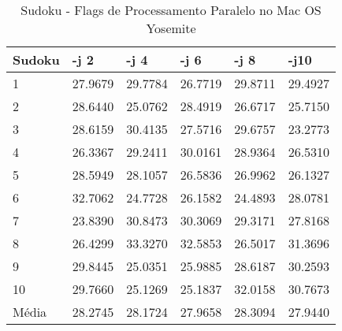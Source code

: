 \begin{table}[!ht]
\centering
\caption{Sudoku - Flags de Processamento Paralelo no Mac OS Yosemite}
\label{tab:flag_processamento_paralelo:mac:sudoku}
\begin{tabular}{llllll}
\textbf{Sudoku} & \textbf{-j 2} & \textbf{-j 4} & \textbf{-j 6} & \textbf{-j 8} & \textbf{-j10}  \\ \toprule
1               & 27.9679 & 29.7784 & 26.7719 & 29.8711 & 29.4927   \\ 
2               & 28.6440 & 25.0762 & 28.4919 & 26.6717 & 25.7150   \\ 
3               & 28.6159 & 30.4135 & 27.5716 & 29.6757 & 23.2773   \\ 
4               & 26.3367 & 29.2411 & 30.0161 & 28.9364 & 26.5310   \\ 
5               & 28.5949 & 28.1057 & 26.5836 & 26.9962 & 26.1327   \\ 
6               & 32.7062 & 24.7728 & 26.1582 & 24.4893 & 28.0781   \\ 
7               & 23.8390 & 30.8473 & 30.3069 & 29.3171 & 27.8168   \\ 
8               & 26.4299 & 33.3270 & 32.5853 & 26.5017 & 31.3696   \\ 
9               & 29.8445 & 25.0351 & 25.9885 & 28.6187 & 30.2593   \\ 
10              & 29.7660 & 25.1269 & 25.1837 & 32.0158 & 30.7673   \\ \bottomrule
Média           & 28.2745 & 28.1724 & 27.9658 & 28.3094 & 27.9440   \\ 
\end{tabular}
\end{table}

